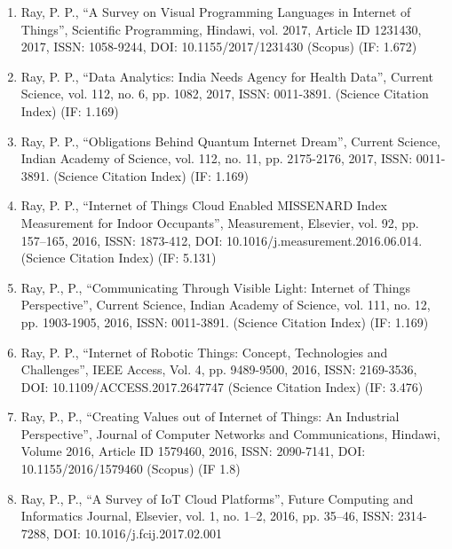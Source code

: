 \documentclass[11pt,a4paper]{moderncv}
\begin{document}
\begin{adjustwidth}{6em}{0pt}
\begin{enumerate}
		\item Ray, P. P., “A Survey on Visual Programming Languages in Internet of Things”, Scientific Programming, Hindawi, vol. 2017, Article ID 1231430, 2017, ISSN: 1058-9244, DOI: 10.1155/2017/1231430 (Scopus) (IF: 1.672)
		
		\item Ray, P. P., “Data Analytics: India Needs Agency for Health Data”, Current Science, vol. 112, no. 6, pp. 1082, 2017, ISSN: 0011-3891. (Science Citation Index) (IF: 1.169)
		
		\item Ray, P. P., “Obligations Behind Quantum Internet Dream”, Current Science, Indian Academy of Science, vol. 112, no. 11, pp. 2175-2176, 2017, ISSN: 0011-3891. (Science Citation Index) (IF: 1.169)
		
		\item Ray, P. P., “Internet of Things Cloud Enabled MISSENARD Index Measurement for Indoor Occupants”, Measurement, Elsevier, vol. 92, pp. 157–165, 2016, ISSN: 1873-412, DOI: 10.1016/j.measurement.2016.06.014. (Science Citation Index) (IF: 5.131)
		
		\item Ray, P., P., “Communicating Through Visible Light: Internet of Things Perspective”, Current Science, Indian Academy of Science, vol. 111, no. 12, pp. 1903-1905, 2016, ISSN: 0011-3891. (Science Citation Index) (IF: 1.169)
		
		\item Ray, P. P., “Internet of Robotic Things: Concept, Technologies and Challenges”, IEEE Access, Vol. 4, pp. 9489-9500, 2016, ISSN: 2169-3536, DOI: 10.1109/ACCESS.2017.2647747 (Science Citation Index) (IF: 3.476)
		
		\item Ray, P., P., “Creating Values out of Internet of Things: An Industrial Perspective”, Journal of Computer Networks and Communications, Hindawi, Volume 2016, Article ID 1579460, 2016, ISSN: 2090-7141, DOI: 10.1155/2016/1579460 (Scopus) (IF 1.8)
		
		\item Ray, P., P., “A Survey of IoT Cloud Platforms”, Future Computing and Informatics Journal, Elsevier, vol. 1, no. 1–2, 2016, pp. 35–46, ISSN: 2314-7288, DOI: 10.1016/j.fcij.2017.02.001
		
		
		
	\end{enumerate}
\end{adjustwidth}
\end{document}
